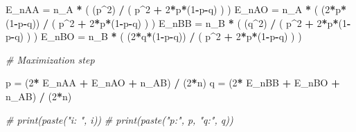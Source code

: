 \documentclass[]{article}
\newenvironment{Shaded}{\begin{snugshade}}{\end{snugshade}}
\newcommand{\DecValTok}[1]{\textcolor[rgb]{0.00,0.00,0.81}{#1}}
\newcommand{\StringTok}[1]{\textcolor[rgb]{0.31,0.60,0.02}{#1}}
\newcommand{\CommentTok}[1]{\textcolor[rgb]{0.56,0.35,0.01}{\textit{#1}}}
\newcommand{\OperatorTok}[1]{\textcolor[rgb]{0.81,0.36,0.00}{\textbf{#1}}}
\newcommand{\NormalTok}[1]{#1}
\begin{document}
\begin{Shaded}
\begin{Highlighting}[]
\NormalTok{        E_nAA =}\StringTok{ }\NormalTok{n_A }\OperatorTok{*}\StringTok{ }\NormalTok{( (p}\OperatorTok{^}\DecValTok{2}\NormalTok{) }\OperatorTok{/}\StringTok{ }\NormalTok{( p}\OperatorTok{^}\DecValTok{2} \OperatorTok{+}\StringTok{ }\DecValTok{2}\OperatorTok{*}\NormalTok{p}\OperatorTok{*}\NormalTok{(}\DecValTok{1}\OperatorTok{-}\NormalTok{p}\OperatorTok{-}\NormalTok{q) ) )}
\NormalTok{        E_nAO =}\StringTok{ }\NormalTok{n_A }\OperatorTok{*}\StringTok{ }\NormalTok{( (}\DecValTok{2}\OperatorTok{*}\NormalTok{p}\OperatorTok{*}\NormalTok{(}\DecValTok{1}\OperatorTok{-}\NormalTok{p}\OperatorTok{-}\NormalTok{q)) }\OperatorTok{/}\StringTok{ }\NormalTok{( p}\OperatorTok{^}\DecValTok{2} \OperatorTok{+}\StringTok{ }\DecValTok{2}\OperatorTok{*}\NormalTok{p}\OperatorTok{*}\NormalTok{(}\DecValTok{1}\OperatorTok{-}\NormalTok{p}\OperatorTok{-}\NormalTok{q) ) )}
\NormalTok{        E_nBB =}\StringTok{ }\NormalTok{n_B }\OperatorTok{*}\StringTok{ }\NormalTok{( (q}\OperatorTok{^}\DecValTok{2}\NormalTok{) }\OperatorTok{/}\StringTok{ }\NormalTok{( p}\OperatorTok{^}\DecValTok{2} \OperatorTok{+}\StringTok{ }\DecValTok{2}\OperatorTok{*}\NormalTok{p}\OperatorTok{*}\NormalTok{(}\DecValTok{1}\OperatorTok{-}\NormalTok{p}\OperatorTok{-}\NormalTok{q) ) )}
\NormalTok{        E_nBO =}\StringTok{ }\NormalTok{n_B }\OperatorTok{*}\StringTok{ }\NormalTok{( (}\DecValTok{2}\OperatorTok{*}\NormalTok{q}\OperatorTok{*}\NormalTok{(}\DecValTok{1}\OperatorTok{-}\NormalTok{p}\OperatorTok{-}\NormalTok{q)) }\OperatorTok{/}\StringTok{ }\NormalTok{( p}\OperatorTok{^}\DecValTok{2} \OperatorTok{+}\StringTok{ }\DecValTok{2}\OperatorTok{*}\NormalTok{p}\OperatorTok{*}\NormalTok{(}\DecValTok{1}\OperatorTok{-}\NormalTok{p}\OperatorTok{-}\NormalTok{q) ) )}
        
        
        \CommentTok{# Maximization step}
        
\NormalTok{        p =}\StringTok{ }\NormalTok{(}\DecValTok{2}\OperatorTok{*}\StringTok{ }\NormalTok{E_nAA }\OperatorTok{+}\StringTok{ }\NormalTok{E_nAO }\OperatorTok{+}\StringTok{ }\NormalTok{n_AB) }\OperatorTok{/}\StringTok{ }\NormalTok{(}\DecValTok{2}\OperatorTok{*}\NormalTok{n) }
\NormalTok{        q =}\StringTok{ }\NormalTok{(}\DecValTok{2}\OperatorTok{*}\StringTok{ }\NormalTok{E_nBB }\OperatorTok{+}\StringTok{ }\NormalTok{E_nBO }\OperatorTok{+}\StringTok{ }\NormalTok{n_AB) }\OperatorTok{/}\StringTok{ }\NormalTok{(}\DecValTok{2}\OperatorTok{*}\NormalTok{n)}
        
        \CommentTok{# print(paste("i: ", i))}
        \CommentTok{# print(paste("p:", p, "q:", q))}
        

\end{Highlighting}
\end{Shaded}
\end{document}

